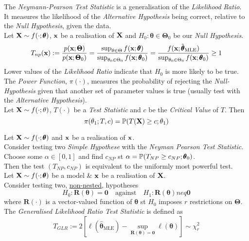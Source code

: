 \documentclass[11pt,a4paper]{article}
\begin{document}
The \textit{Neymann-Pearson Test Statistic} is a generalisation of the \textit{Likelihood Ratio}.\\
It measures the likelihood of the \textit{Alternative Hypothesis} being correct, relative to the \textit{Null Hypothesis}, given the data.\\
Let $\textbf{X}\sim f(\cdot;\pmb\theta)$, $\textbf{x}$ be a realisation of $\textbf{X}$ and $H_0:\pmb\theta\in\pmb\Theta_0$ be our \textit{Null Hypothesis}.
$$T_{np}(\textbf{x}):=\dfrac{p(\textbf{x};\pmb\Theta)}{p(\textbf{x};\pmb\Theta_0)}=\dfrac{\sup_{\theta\in\Theta} f(\textbf{x};\pmb\theta)}{\sup_{\theta_0\in\Theta_0}f(\textbf{x};\pmb\theta_0)}=\dfrac{f(\textbf{x};\hat{\pmb\theta}_\text{MLE})}{\sup_{\theta_0\in\Theta_0}f(\textbf{x};\pmb\theta_0)}\geq1$$
Lower values of the \textit{Likelihood Ratio} indicate that $H_0$ is more likely to be true.\\

The \textit{Power Function}, $\pi(\cdot)$, measures the probability of rejecting the \textit{Null-Hypothesis} given that another set of parameter values is true (usually test with the \textit{Alternative Hypothesis}).\\
Let $\textbf{X}\sim f(\cdot;\theta)$, $T(\cdot)$ be a \textit{Test Statistic} and $c$ be the \textit{Critical Value} of $T$. Then
$$\pi(\theta_1;T,c)=\mathbb{P}(T(\textbf{X})\geq c;\theta_1)$$

Let $\textbf{X}\sim f(\cdot;\pmb\theta)$ and $\textbf{x}$ be a realisation of $\textbf{x}$.\\
Consider testing two \textit{Simple Hypothese} with the \textit{Neyman Pearson Test Statistic}.\\
Choose some $\alpha\in[0,1]$ and find $c_{NP}$ st $\alpha=\mathbb{P}(T_{NP}\geq c_{NP};\pmb\theta_0)$.\\
Then the test $(T_{NP},c_{NP})$ is equivalent to the uniformly most powerful test.\\

Let $\textbf{X}\sim f(\cdot;\pmb\theta)$ be a model \& $\textbf{x}$ be a realisation of $\textbf{X}$.\\
Consider testing two, \underline{non-nested}, hypotheses
$$H_0:\textbf{R}(\pmb\theta)=\pmb0\quad\text{against}\quad H_1:\textbf{R}(\pmb\theta)neq\pmb0$$
where $\textbf{R}(\cdot)$ is a vector-valued function of $\pmb\theta$ st $H_0$ imposes $r$ restrictions on $\pmb\Theta$.\\
The \textit{Generalised Likelihood Ratio Test Statistic} is defined as
$$T_{GLR}:=2[\ell(\hat{\pmb\theta}_\text{MLE})-\sup_{\textbf{R}(\pmb\theta)=\pmb0}\ell(\pmb\theta)]\sim\chi^2_r$$
\end{document}
